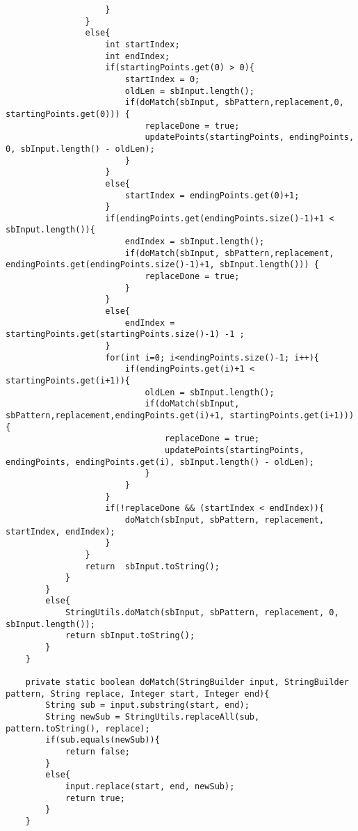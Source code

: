 \documentclass{article}
\begin{document}
\begin{lstlisting}
                    }
                }
                else{
                    int startIndex;
                    int endIndex;
                    if(startingPoints.get(0) > 0){
                        startIndex = 0;
                        oldLen = sbInput.length();
                        if(doMatch(sbInput, sbPattern,replacement,0, startingPoints.get(0))) {
                            replaceDone = true;
                            updatePoints(startingPoints, endingPoints, 0, sbInput.length() - oldLen);
                        }
                    }
                    else{
                        startIndex = endingPoints.get(0)+1;
                    }
                    if(endingPoints.get(endingPoints.size()-1)+1 < sbInput.length()){
                        endIndex = sbInput.length();
                        if(doMatch(sbInput, sbPattern,replacement, endingPoints.get(endingPoints.size()-1)+1, sbInput.length())) {
                            replaceDone = true;
                        }
                    }
                    else{
                        endIndex = startingPoints.get(startingPoints.size()-1) -1 ;
                    }
                    for(int i=0; i<endingPoints.size()-1; i++){
                        if(endingPoints.get(i)+1 < startingPoints.get(i+1)){
                            oldLen = sbInput.length();
                            if(doMatch(sbInput, sbPattern,replacement,endingPoints.get(i)+1, startingPoints.get(i+1))){
                                replaceDone = true;
                                updatePoints(startingPoints, endingPoints, endingPoints.get(i), sbInput.length() - oldLen);
                            }
                        }
                    }
                    if(!replaceDone && (startIndex < endIndex)){
                        doMatch(sbInput, sbPattern, replacement, startIndex, endIndex);
                    }
                }
                return  sbInput.toString();
            }
        }
        else{
            StringUtils.doMatch(sbInput, sbPattern, replacement, 0, sbInput.length());
            return sbInput.toString();
        }
    }

    private static boolean doMatch(StringBuilder input, StringBuilder pattern, String replace, Integer start, Integer end){
        String sub = input.substring(start, end);
        String newSub = StringUtils.replaceAll(sub, pattern.toString(), replace);
        if(sub.equals(newSub)){
            return false;
        }
        else{
            input.replace(start, end, newSub);
            return true;
        }
    }


\end{lstlisting}
\end{document}
